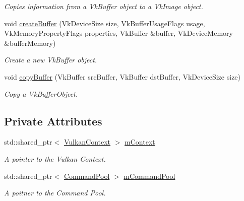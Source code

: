 \begin{DoxyCompactItemize}
\begin{DoxyCompactList}\small\item\em Copies information from a Vk\+Buffer object to a Vk\+Image object. \end{DoxyCompactList}\item 
void \mbox{\hyperlink{class_buffer_manager_abcb26e15d2122483e6b70ab2b598b521}{create\+Buffer}} (Vk\+Device\+Size size, Vk\+Buffer\+Usage\+Flags usage, Vk\+Memory\+Property\+Flags properties, Vk\+Buffer \&buffer, Vk\+Device\+Memory \&buffer\+Memory)
\begin{DoxyCompactList}\small\item\em Create a new Vk\+Buffer object. \end{DoxyCompactList}\item 
void \mbox{\hyperlink{class_buffer_manager_af126ee94ee4e2a4a0b7cf0d4aa6b0c65}{copy\+Buffer}} (Vk\+Buffer src\+Buffer, Vk\+Buffer dst\+Buffer, Vk\+Device\+Size size)
\begin{DoxyCompactList}\small\item\em Copy a Vk\+Buffer\+Object. \end{DoxyCompactList}\end{DoxyCompactItemize}
\subsection*{Private Attributes}
\begin{DoxyCompactItemize}
\item 
\mbox{\label{class_buffer_manager_a487b89a07aff1b3066bf584aa60a725c}} 
std\+::shared\+\_\+ptr$<$ \mbox{\hyperlink{class_vulkan_context}{Vulkan\+Context}} $>$ \mbox{\hyperlink{class_buffer_manager_a487b89a07aff1b3066bf584aa60a725c}{m\+Context}}
\begin{DoxyCompactList}\small\item\em A pointer to the Vulkan Context. \end{DoxyCompactList}\item 
\mbox{\label{class_buffer_manager_adbb93943d98c9e8ce1c569413aae9f7c}} 
std\+::shared\+\_\+ptr$<$ \mbox{\hyperlink{class_command_pool}{Command\+Pool}} $>$ \mbox{\hyperlink{class_buffer_manager_adbb93943d98c9e8ce1c569413aae9f7c}{m\+Command\+Pool}}
\begin{DoxyCompactList}\small\item\em A poitner to the Command Pool. \end{DoxyCompactList}\end{DoxyCompactItemize}


